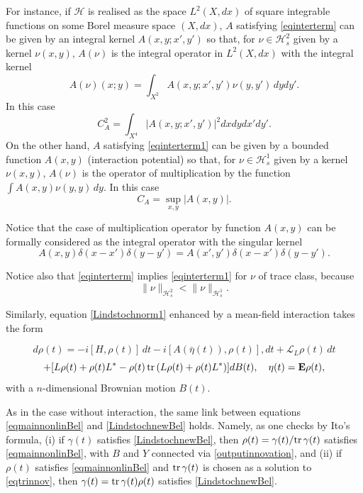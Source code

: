 \documentclass[12pt]{article}
\def\LC{\mathcal{L}}
\def\HC{\mathcal{H}}
\def\E{\mathbf{E}}
\def\tr{\rm{tr}}
\def\de{\delta}
\def\ga{\gamma}
\begin{document}
For instance, if $\HC$ is realised as the space $L^2(X, dx)$ of
square integrable functions on some Borel measure space $(X,dx)$,
$A$ satisfying \eqref{eqinterterm} can be given by an integral kernel
$A(x,y;x',y')$ so that, for $\nu\in \HC^2_s$ given by a kernel $\nu(x,y)$,
$A(\nu)$ is the integral operator in $L^2(X,dx)$ with the integral kernel
\begin{equation}
\label{eqinterterm2}
A(\nu)(x;y)=\int_{X^2} A(x,y;x',y')\nu (y,y') \, dydy'.
\end{equation}
In this case
\[
C_A^2=  \int_{X^4} |A(x,y;x',y')|^2 dx dy dx'dy'.
\]
On the other hand, $A$ satisfying \eqref{eqinterterm1} can be given by a
bounded function $A(x,y)$ (interaction potential) so that, for $\nu \in \HC^1_s$ given by a kernel $\nu(x,y)$,
$A(\nu)$ is the operator of multiplication by the function
$\int A(x, y)\nu(y,y) \, dy$.
In this case
\[
C_A= \sup_{x,y} |A(x,y)|.
\]

Notice that the case of multiplication operator by function $A(x,y)$ can be formally considered as
the integral operator with the singular kernel
\begin{equation}
\label{multint}
A(x,y)\de (x-x')\de (y-y')=A(x',y')\de (x-x')\de (y-y').
\end{equation}

Notice also that \eqref{eqinterterm} implies \eqref{eqinterterm1} for $\nu$ of trace class, because
\[
 \|\nu\|_{\HC^2_s} <  \|\nu\|_{\HC^1_s}.
\]


Similarly, equation \eqref{Lindstochnorm1} enhanced by a mean-field interaction takes the form

\[
d\rho(t)=-i[H,\rho(t)] \, dt -i[A(\bar \eta(t)), \rho(t)] , dt +\LC_L \rho(t) \, dt
\]
\begin{equation}
\label{eqmainnonlinBel}
+[L\rho(t)+\rho(t) L^*-\rho(t)\, {\tr} \, (L\rho(t)+\rho(t) L^*) ] dB(t),
\quad \eta (t) =\E \rho (t),
\end{equation}
with a $n$-dimensional Brownian motion $B(t)$.

As in the case without interaction, the same link between equations \eqref{eqmainnonlinBel}
and \eqref{LindstochnewBel} holds. Namely, as one checks by Ito's formula, (i)
if $\ga(t)$ satisfies \eqref{LindstochnewBel}, then $\rho(t)=\ga(t)/{\tr}\, \ga(t)$ satisfies
 \eqref{eqmainnonlinBel}, with $B$ and $Y$ connected via \eqref{outputinnovation}, and (ii) if
 $\rho(t)$ satisfies \eqref{eqmainnonlinBel} and ${\tr} \, \ga(t)$ is chosen as a solution
 to \eqref{eqtrinnov}, then $\ga(t)={\tr}\, \ga (t) \rho(t)$ satisfies  \eqref{LindstochnewBel}.
\end{document}
